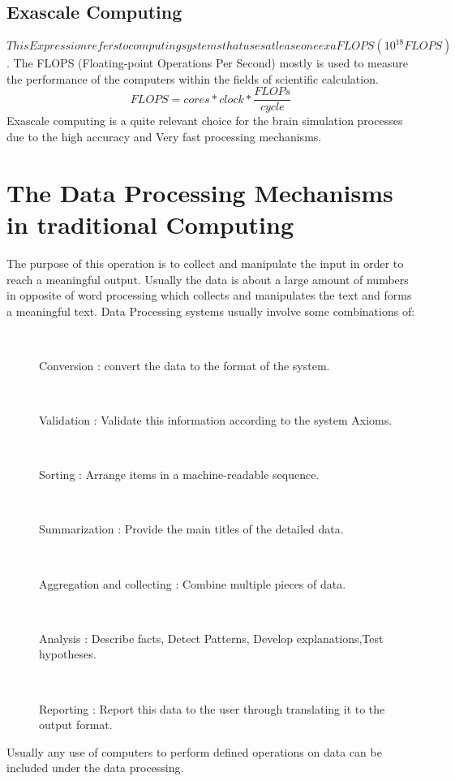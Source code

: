 \documentclass{article}
\let\Item\item
\newcommand\SpecialItem{\renewcommand\item[1][]{\Item[\textbullet~\bfseries##1]}}
\begin{document}
\subsection*{Exascale Computing}
\begin{math}
This Expression refers to computing systems that uses at lease one exaFLOPS(10^{18} FLOPS)
\end{math}. The FLOPS (Floating-point Operations Per Second) mostly is used to measure the performance of the computers within the fields of scientific calculation.
\begin{equation}
FLOPS = cores * clock * \frac{FLOPs}{cycle}
\end{equation} 
Exascale computing is a quite relevant choice for the brain simulation processes due to the high accuracy and Very fast processing mechanisms.


\section*{The Data Processing Mechanisms in traditional Computing}
The purpose of this operation is to collect and manipulate the input in order to reach a meaningful output.
Usually the data is about a large amount of numbers in opposite of word processing which collects and manipulates the text and forms a meaningful text.
Data Processing systems usually involve some combinations of:
\SpecialItem
\begin{description}
\item Conversion : convert the data to the format of the system.
\item Validation : Validate this information according to the system Axioms.
\item Sorting : Arrange items in a machine-readable sequence.
\item Summarization : Provide the main titles of the detailed data.
\item Aggregation and collecting : Combine multiple pieces of data.
\item Analysis :  Describe facts, Detect Patterns, Develop explanations,Test hypotheses.
\item Reporting : Report this data to the user through translating it to the output format.
\end{description}\cite{Koch}
Usually any use of computers to perform defined operations on data can be included under the data processing.
\end{document}
